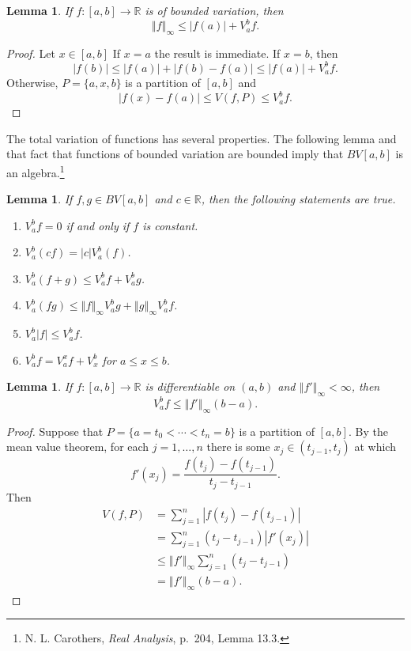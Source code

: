 \documentclass{article}
\newcommand{\norm}[1]{\left\Vert #1 \right\Vert}
\newtheorem{lemma}[theorem]{Lemma}
\theoremstyle{definition}
\begin{document}
\begin{lemma}
If $f:[a,b] \to \mathbb{R}$ is of bounded variation, then
\[
\norm{f}_\infty \leq |f(a)|+V_a^b f.
\]
\label{supremum}
\end{lemma}
\begin{proof}
Let $x \in [a,b]$ If $x=a$ the result is immediate. If $x=b$, then
\[
|f(b)| \leq |f(a)|+|f(b)-f(a)| \leq |f(a)|+V_a^b f.
\]
Otherwise, $P=\{a,x,b\}$ is a partition of $[a,b]$ and
\[
|f(x)-f(a)| \leq V(f,P) \leq V_a^b f.
\]
\end{proof}

The total variation of functions has several properties. The following
lemma and that fact that functions of bounded variation are bounded imply that $BV[a,b]$ is an algebra.\footnote{N. L. Carothers, {\em Real Analysis}, p.~204, Lemma 13.3.} 

\begin{lemma}
If $f,g \in BV[a,b]$ and $c \in \mathbb{R}$, then the following statements are true.
\begin{enumerate}
\item $V_a^b f=0$ if and only if $f$ is constant.
\item $V_a^b(cf)=|c| V_a^b(f)$.
\item $V_a^b(f+g) \leq V_a^b f+V_a^b g$.
\item $V_a^b(fg) \leq \norm{f}_\infty V_a^b g+\norm{g}_\infty V_a^b f$.
\item $V_a^b |f| \leq V_a^b f$.
\item $V_a^b f = V_a^x f + V_x^b$ for $a \leq x \leq b$.
\end{enumerate}
\label{norm}
\end{lemma}


\begin{lemma}
If $f:[a,b] \to \mathbb{R}$ is differentiable on $(a,b)$ and $\norm{f'}_\infty < \infty$, then
\[
V_a^b f \leq \norm{f'}_\infty (b-a).
\]
\end{lemma}
\begin{proof}
Suppose that $P=\{a=t_0<\cdots<t_n=b\}$ is a partition of $[a,b]$. 
By the mean value theorem, 
for each $j=1,\ldots,n$ there is some $x_j \in (t_{j-1},t_j)$ at which
\[
f'(x_j)=\frac{f(t_j)-f(t_{j-1})}{t_j-t_{j-1}}.
\]
Then
\begin{align*}
V(f,P)&=\sum_{j=1}^n |f(t_j)-f(t_{j-1})|\\
&=\sum_{j=1}^n (t_j-t_{j-1})|f'(x_j)|\\
&\leq \norm{f'}_\infty \sum_{j=1}^n (t_j-t_{j-1})\\
&=\norm{f'}_\infty (b-a).
\end{align*}
\end{proof}
\end{document}
